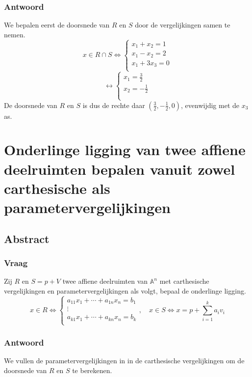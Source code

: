 \documentclass[main.tex]{subfiles}
\begin{document}
\subsubsection{Antwoord}
We bepalen eerst de doorsnede van $R$ en $S$ door de vergelijkingen samen te nemen.
\[
  x\in R \cap S \Leftrightarrow
  \left\{
    \begin{array}{c}
      x_{1}+x_{2}=1\\
      x_{1}-x_{2} = 2\\
      x_{1} + 3x_{3} = 0\\
    \end{array}
  \right.
\]
\[
\leftrightarrow
  \left\{
    \begin{array}{c}
      x_{1}=\frac{3}{2}\\
      x_{2}=-\frac{1}{2}\\
      \\
    \end{array}
  \right.
\]
De doorsnede van $R$ en $S$ is dus de rechte daar $(\frac{3}{2},-\frac{1}{2},0)$, evenwijdig met de $x_{3}$ as.

\newpage
\section{Onderlinge ligging van twee affiene deelruimten bepalen vanuit zowel carthesische als parametervergelijkingen}
\subsection{Abstract}
\subsubsection{Vraag}
\begin{center}
  Zij $R$ en $S=p+V$ twee affiene deelruimten van $\mathbb{A}^{n}$ met carthesische vergelijkingen en parametervergelijkingen als volgt, bepaal de onderlinge ligging.
  \[
  x \in R \Leftrightarrow
  \left\{
    \begin{array}{c}
      a_{11}x_{1} + \dotsb + a_{1n}x_{n} = b_{1}\\
      \vdots\\
      a_{k1}x_{1} + \dotsb + a_{kn}x_{n} = b_{k}\\
    \end{array}
  \right.
  ,\quad
  x\in S \Leftrightarrow
  x= p+ \sum_{i=1}^{k}a_{i}v_{i}
  \]
\end{center}

\subsubsection{Antwoord}
We vullen de parametervergelijkingen in in de carthesische vergelijkingen om de doorsnede van $R$ en $S$ te berekenen.
\end{document}
